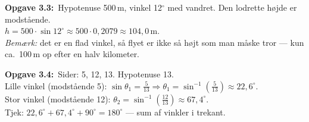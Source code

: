 \documentclass[11pt,a4paper]{article}
\newcommand{\f}[2]{%
  \par\vspace{0.35em}\noindent\textbf{Opgave #1:}\ #2\par
}
\begin{document}
\f{3.3}{Hypotenuse 500\,m, vinkel 12$^\circ$ med vandret. Den lodrette højde er modstående.\\[2pt]
$h=500\cdot\sin 12^\circ\approx 500\cdot 0{,}2079\approx 104{,}0$\,m.\\[2pt]
\textit{Bemærk:} det er en flad vinkel, så flyet er ikke så højt som man måske tror — kun ca.\ 100\,m op efter en halv kilometer.}

\f{3.4}{Sider: 5, 12, 13. Hypotenuse 13.\\[2pt]
Lille vinkel (modstående 5): $\sin\theta_1=\tfrac{5}{13}\Rightarrow\theta_1=\sin^{-1}(\tfrac{5}{13})\approx 22{,}6^\circ$.\\[2pt]
Stor vinkel (modstående 12): $\theta_2=\sin^{-1}(\tfrac{12}{13})\approx 67{,}4^\circ$.\\[2pt]
Tjek: $22{,}6^\circ+67{,}4^\circ+90^\circ=180^\circ$ — sum af vinkler i trekant.}
\end{document}
